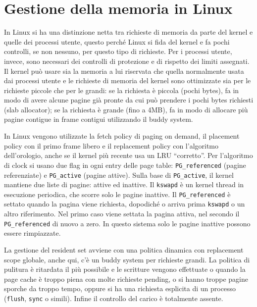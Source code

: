\section{Gestione della memoria in Linux}
In Linux si ha una distinzione netta tra richieste di memoria da parte del kernel e quelle dei processi utente, questo perché Linux si fida del kernel e fa pochi controlli, se non nessuno, per questo tipo di richieste. Per i processi utente, invece, sono necessari dei controlli di protezione e di rispetto dei limiti assegnati. Il kernel può usare sia la memoria a lui riservata che quella normalmente usata dai processi utente e le richieste di memoria del kernel sono ottimizzate sia per le richieste piccole che per le grandi: se la richiesta è piccola (pochi bytes), fa in modo di avere alcune pagine già pronte da cui può prendere i pochi bytes richiesti (slab allocator); se la richiesta è grande (fino a 4MB), fa in modo di allocare più pagine contigue in frame contigui utilizzando il buddy system.

In Linux vengono utilizzate la fetch policy di paging on demand, il placement policy con il primo frame libero e il replacement policy con l'algoritmo dell'orologio, anche se il kernel più recente usa un LRU “corretto”. Per l'algoritmo di clock si usano due flag in ogni entry delle page table: \verb|PG_referenced| (pagine referenziate) e \verb|PG_active| (pagine attive). Sulla base di \verb|PG_active|, il kernel mantiene due liste di pagine: attive ed inattive. Il \verb|kswapd| è un kernel thread in esecuzione periodica, che scorre solo le pagine inattive. Il \verb|PG_referenced| è settato quando la pagina viene richiesta, dopodiché o arriva prima \verb|kswapd| o un altro riferimento. Nel primo caso viene settata la pagina attiva, nel secondo il \verb|PG_referenced| di nuovo a zero. In questo sistema solo le pagine inattive possono essere rimpiazzate.

La gestione del resident set avviene con una politica dinamica con replacement scope globale, anche qui, c'è un buddy system per richieste grandi. La politica di pulitura è ritardata il più possibile e le scritture vengono effettuate o quando la page cache è troppo piena con molte richieste pending, o si hanno troppe pagine sporche da troppo tempo, oppure si ha una richiesta esplicita di un processo (\verb|flush|, \verb|sync| o simili). Infine il controllo del carico è totalmente assente.
